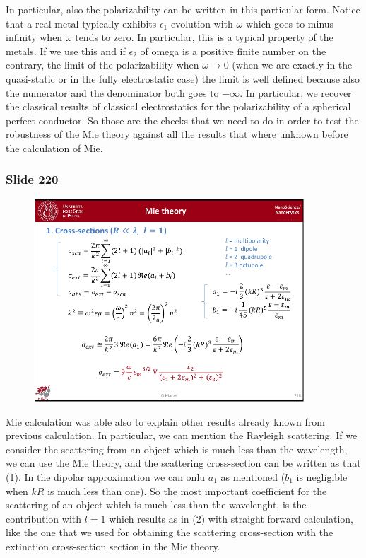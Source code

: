 \documentclass[../main/main.tex]{subfiles}
\begin{document}
In particular, also the polarizability can be written in this particular form.
Notice that a real metal typically exhibits $\epsilon_1$ evolution with $\omega$ which goes to minus infinity when $\omega$ tends to zero.
In particular, this is a typical property of the metals. If we use this and if $\epsilon_2$ of omega is a positive finite number on the contrary, the limit of the polarizability when $\omega \rightarrow 0$ (when we are exactly in the quasi-static or in the fully electrostatic case) the limit is well defined because also the numerator and the denominator both goes to \( - \infty  \). In particular, we recover the classical results of classical electrostatics for the polarizability of a spherical perfect conductor.
So those are the checks that we need to do in order to test the robustness of the Mie theory against all the results that where unknown before the calculation of Mie.



\newpage
\subsubsection{Slide 220}

\begin{figure}[h!]
\centering
\includegraphics[page=3,width=0.9\textwidth]{../lessons/pdf_file/14_lesson.pdf}
\end{figure}

Mie calculation was able also to explain other results already known from previous calculation. In particular, we can mention the Rayleigh scattering.
If we consider the scattering from an object which is much less than the wavelength, we can use the Mie theory, and the scattering cross-section can be written as that (1). In the dipolar approximation we can onlu \( a_1 \) as mentioned ($b_1$ is negligible when \( k R \) is much less than one). So the most important coefficient for the scattering of an object which is much less than the wavelenght, is the contribution with \( l=1 \) which results as in (2) with straight forward calculation, like the one that we used for obtaining the scattering cross-section with the extinction cross-section section in the Mie theory.
\end{document}
